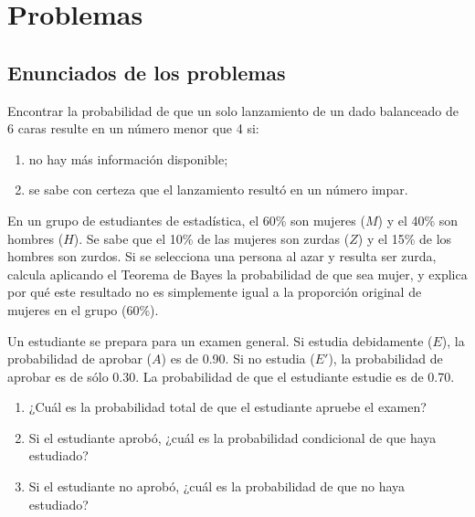 \section*{Problemas}

\subsection*{Enunciados de los problemas}

\begin{problema}
	\label{prob:054ed26}
	Encontrar la probabilidad de que un solo lanzamiento de un dado balanceado de 6 caras resulte en un número menor que 4 si:
	\begin{enumerate}
		\item no hay más información disponible;
		\item se sabe con certeza que el lanzamiento resultó en un número impar.
	\end{enumerate}
\end{problema}

\begin{problema}
	\label{prob:bde7784}
	En un grupo de estudiantes de estadística, el 60\% son mujeres ($M$) y el 40\% son hombres ($H$). Se sabe que el 10\% de las mujeres son zurdas ($Z$) y el 15\% de los hombres son zurdos. Si se selecciona una persona al azar y resulta ser zurda, calcula aplicando el Teorema de Bayes la probabilidad de que sea mujer, y explica por qué este resultado no es simplemente igual a la proporción original de mujeres en el grupo ($60\%$).
\end{problema}

\begin{problema}
	\label{prob:e14faa0}
	Un estudiante se prepara para un examen general. Si estudia debidamente ($E$), la probabilidad de aprobar ($A$) es de 0.90. Si no estudia ($E'$), la probabilidad de aprobar es de sólo 0.30. La probabilidad de que el estudiante estudie es de 0.70.
	\begin{enumerate}
		\item ¿Cuál es la probabilidad total de que el estudiante apruebe el examen?
		\item Si el estudiante aprobó, ¿cuál es la probabilidad condicional de que haya estudiado?
		\item Si el estudiante no aprobó, ¿cuál es la probabilidad de que no haya estudiado?
	\end{enumerate}
\end{problema}

